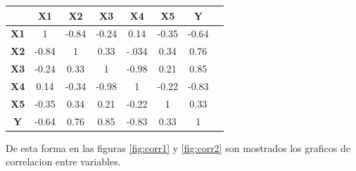 \documentclass[a4paper]{article}
\begin{document}
\begin{center}
    \begin{tabular}{|c|c|c|c|c|c|c|c|}
        \hline
                        & \textbf{X1}   & \textbf{X2}   & \textbf{X3}   & \textbf{X4}   & \textbf{X5} &\textbf{Y}\\
        \hline            
        \textbf{X1}     & 1         &  -0.84       &    -0.24      &    0.14      & -0.35     & -0.64  \\
        \hline
        \textbf{X2}     & -0.84      & 1     & 0.33    &    -.034   & 0.34    & 0.76   \\
        \hline
        \textbf{X3}     & -0.24     &  0.33    & 1  & -0.98     & 0.21  & 0.85  \\
        \hline
        \textbf{X4}     &   0.14   & -0.34   &  -0.98 & 1    & -0.22     & -0.83   \\
        \hline
        \textbf{X5}     &   -0.35   &   0.34    &    0.21  &    -0.22 & 1     & 0.33   \\
        \hline
        \textbf{Y}      &   -0.64   &   0.76  & 0.85&   -0.83   &   0.33   & 1     \\
        \hline
    \end{tabular}
\end{center}
De esta forma en las figuras \ref{fig:corr1} y \ref{fig:corr2} son mostrados los graficos de correlacion entre variables.
\end{document}
